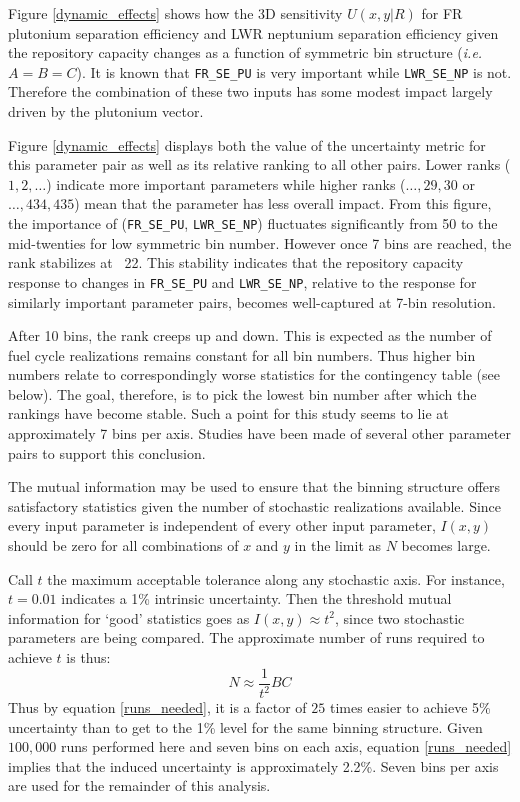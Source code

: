 \documentclass[preprint,12pt]{elsarticle}
\begin{document}
Figure \ref{dynamic_effects} shows how the 3D sensitivity $U(x,y|R)$ for FR plutonium separation efficiency and LWR neptunium separation efficiency given the repository
capacity changes as a function of symmetric bin structure (\emph{i.e.} $A=B=C$).  It is known that \texttt{FR\_SE\_PU} is very important
while \texttt{LWR\_SE\_NP} is not.  Therefore the combination of these two inputs has some modest impact largely driven by the plutonium vector.

Figure \ref{dynamic_effects} displays both the value of the uncertainty metric for this parameter pair as well as its relative ranking to all other pairs.
Lower ranks ($1, 2, \ldots$) indicate more important parameters while higher ranks ($\ldots, 29, 30$ or $\ldots, 434, 435$) mean that the parameter has less overall
impact.  From this figure, the importance of (\texttt{FR\_SE\_PU}, \texttt{LWR\_SE\_NP}) fluctuates significantly from 50 to the mid-twenties for low symmetric
bin number.  However once 7 bins are reached, the rank stabilizes at ~22.  This stability indicates that the repository capacity response to changes in \texttt{FR\_SE\_PU} and \texttt{LWR\_SE\_NP}, relative to the response for similarly important parameter pairs, becomes well-captured at 7-bin resolution.

After 10 bins, the rank creeps up and down.  This is expected as the number of
fuel cycle realizations remains constant for all bin numbers.  Thus higher bin numbers relate to correspondingly worse statistics for the contingency table (see below).  The goal, therefore, is to pick the lowest bin number after which the rankings have become stable.  Such a point for this study seems to lie at approximately
7 bins per axis.  Studies have been made of several other parameter pairs to support this conclusion.

The mutual information may be used to ensure that the binning structure offers satisfactory statistics given the number of stochastic realizations available.  Since every input parameter is independent of every other input parameter, $I(x,y)$ should be zero for all combinations of $x$ and $y$
in the limit as $N$ becomes large.

Call $t$ the maximum acceptable tolerance along any stochastic axis.
For instance, $t = 0.01$ indicates a 1\% intrinsic uncertainty.
Then the threshold mutual information for `good' statistics goes as $I(x,y) \approx t^2$, since
two stochastic parameters are being compared.  The approximate number of runs required to achieve $t$ is thus:
\begin{equation}
N \approx \frac{1}{t^2} B C
\label{runs_needed}
\end{equation}
Thus by equation \ref{runs_needed}, it is a factor of $25$ times easier to achieve 5\% uncertainty than to get to the 1\% level for the same binning structure.
Given $100,000$ runs performed here and seven bins on each axis, equation \ref{runs_needed} implies
that the induced uncertainty is approximately 2.2\%.  Seven bins per axis are used for the remainder of this analysis.
\end{document}
